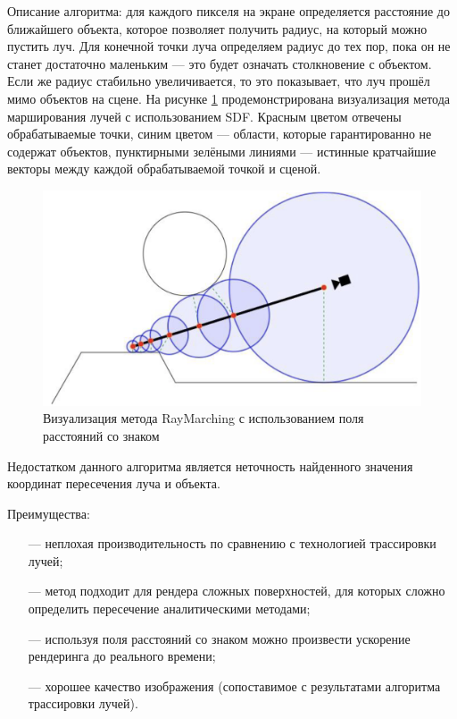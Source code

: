 Описание алгоритма: для каждого пикселя на экране определяется 
расстояние до ближайшего объекта, которое позволяет получить радиус, на который 
можно пустить луч. 
Для конечной точки луча определяем радиус до тех пор, 
пока он не станет достаточно маленьким --- это будет означать столкновение с 
объектом.
Если же радиус стабильно увеличивается, то это показывает, что луч 
прошёл мимо объектов на сцене.
На рисунке \ref{fig:raymarchingsdf} продемонстрирована визуализация метода марширования лучей с использованием SDF. Красным цветом отвечены обрабатываемые точки, синим цветом --- области, которые гарантированно не содержат объектов, пунктирными зелёными линиями --- истинные кратчайшие векторы между каждой обрабатываемой точкой и сценой.


\begin{figure}[h]
	\centering
	\captionsetup{justification=centering}
	\includegraphics[width=120mm]{img/raymarchingsdf.png}
	\caption{Визуализация метода RayMarching с использованием поля расстояний со знаком}
	\label{fig:raymarchingsdf}
\end{figure}

Недостатком данного алгоритма является неточность найденного значения координат пересечения луча и объекта.

Преимущества:
\begin{itemize}[leftmargin=1.6\parindent]
	\item[---] неплохая производительность по сравнению с технологией трассировки лучей;
	\item[---] метод подходит для рендера сложных поверхностей, для которых 
	сложно определить пересечение аналитическими методами;
	\item[---] используя поля расстояний со знаком можно произвести ускорение    
	рендеринга до реального времени;
	\item[---] хорошее качество изображения (сопоставимое с результатами алгоритма трассировки лучей).     
\end{itemize}

